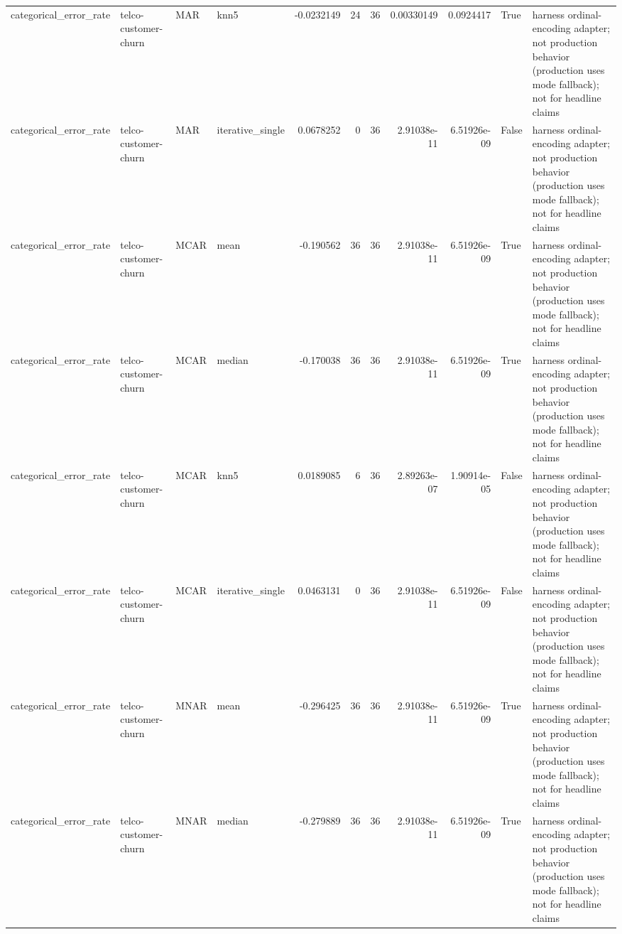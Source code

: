 \begin{table}[ht]
\begin{tabular}{llllrrrrrll}
 categorical\_error\_rate & telco-customer-churn & MAR         & knn5             &     -0.0232149   &                  24 &      36 & 0.00330149  & 0.0924417   & True               & harness ordinal-encoding adapter; not production behavior (production uses mode fallback); not for headline claims \\
 categorical\_error\_rate & telco-customer-churn & MAR         & iterative\_single &      0.0678252   &                   0 &      36 & 2.91038e-11 & 6.51926e-09 & False              & harness ordinal-encoding adapter; not production behavior (production uses mode fallback); not for headline claims \\
 categorical\_error\_rate & telco-customer-churn & MCAR        & mean             &     -0.190562    &                  36 &      36 & 2.91038e-11 & 6.51926e-09 & True               & harness ordinal-encoding adapter; not production behavior (production uses mode fallback); not for headline claims \\
 categorical\_error\_rate & telco-customer-churn & MCAR        & median           &     -0.170038    &                  36 &      36 & 2.91038e-11 & 6.51926e-09 & True               & harness ordinal-encoding adapter; not production behavior (production uses mode fallback); not for headline claims \\
 categorical\_error\_rate & telco-customer-churn & MCAR        & knn5             &      0.0189085   &                   6 &      36 & 2.89263e-07 & 1.90914e-05 & False              & harness ordinal-encoding adapter; not production behavior (production uses mode fallback); not for headline claims \\
 categorical\_error\_rate & telco-customer-churn & MCAR        & iterative\_single &      0.0463131   &                   0 &      36 & 2.91038e-11 & 6.51926e-09 & False              & harness ordinal-encoding adapter; not production behavior (production uses mode fallback); not for headline claims \\
 categorical\_error\_rate & telco-customer-churn & MNAR        & mean             &     -0.296425    &                  36 &      36 & 2.91038e-11 & 6.51926e-09 & True               & harness ordinal-encoding adapter; not production behavior (production uses mode fallback); not for headline claims \\
 categorical\_error\_rate & telco-customer-churn & MNAR        & median           &     -0.279889    &                  36 &      36 & 2.91038e-11 & 6.51926e-09 & True               & harness ordinal-encoding adapter; not production behavior (production uses mode fallback); not for headline claims \\

\end{tabular}
\end{table}
